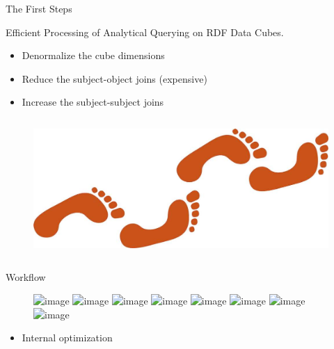 \begin{frame}{The First Steps}
\begin{block}{}
 Efficient Processing of Analytical Querying on RDF Data Cubes.
\end{block}
\pause
\begin{itemize}
    \item Denormalize the cube dimensions
    \item Reduce the subject-object joins (expensive)
    \item Increase the subject-subject joins
\end{itemize}
\begin{columns}

\begin{figure}
    \includegraphics[width=\textwidth]{images/step-by-clip-art-849063.jpg}
\end{figure}
\end{columns}

\end{frame}

\begin{frame}{Workflow}

\begin{figure}
\centering
    \includegraphics<+>[trim=0 655 253 0,clip,height=0.7\textheight]{images/Workflow-3}
    \includegraphics<+>[trim=0 655 253 0,clip,height=0.7\textheight]{images/Workflow-4}
    \includegraphics<+>[trim=0 655 253 0,clip,height=0.7\textheight]{images/Workflow-5}
    \includegraphics<+>[trim=0 655 253 0,clip,height=0.7\textheight]{images/Workflow-6}
    \includegraphics<+>[trim=0 655 253 0,clip,height=0.7\textheight]{images/Workflow-7}
    \includegraphics<+>[trim=0 655 253 0,clip,height=0.7\textheight]{images/Workflow-8}
    \includegraphics<+>[trim=0 655 253 0,clip,height=0.7\textheight]{images/Workflow-9}
    \includegraphics<+->[trim=0 655 253 0,clip,height=0.7\textheight]{images/Workflow-10}
\end{figure}
\begin{itemize}
    \item<+-> Internal optimization 
\end{itemize}
\end{frame}

